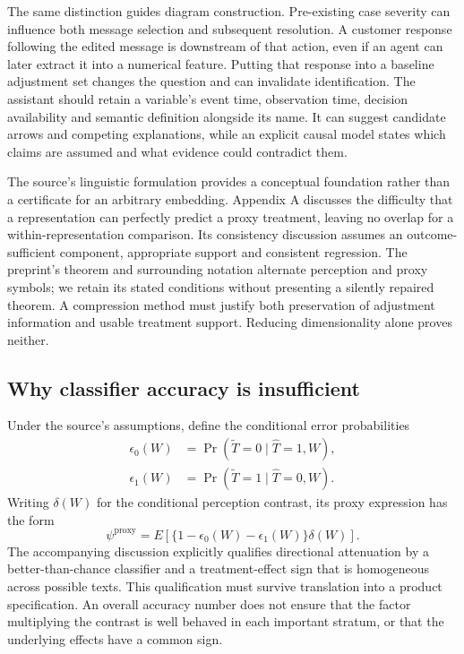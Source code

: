 The same distinction guides diagram construction. Pre-existing case severity can influence both message selection and subsequent resolution. A customer response following the edited message is downstream of that action, even if an agent can later extract it into a numerical feature. Putting that response into a baseline adjustment set changes the question and can invalidate identification. The assistant should retain a variable's event time, observation time, decision availability and semantic definition alongside its name. It can suggest candidate arrows and competing explanations, while an explicit causal model states which claims are assumed and what evidence could contradict them.

The source's linguistic formulation provides a conceptual foundation rather than a certificate for an arbitrary embedding. Appendix A discusses the difficulty that a representation can perfectly predict a proxy treatment, leaving no overlap for a within-representation comparison. Its consistency discussion assumes an outcome-sufficient component, appropriate support and consistent regression. The preprint's theorem and surrounding notation alternate perception and proxy symbols; we retain its stated conditions without presenting a silently repaired theorem. A compression method must justify both preservation of adjustment information and usable treatment support. Reducing dimensionality alone proves neither.~\citep{exec28_lm_pryzant}

\subsection{Why classifier accuracy is insufficient}

Under the source's assumptions, define the conditional error probabilities
\begin{align}
 \epsilon_0(W)&=\Pr(\widetilde T=0\mid\widehat T=1,W),\\
 \epsilon_1(W)&=\Pr(\widetilde T=1\mid\widehat T=0,W).
\end{align}
Writing $\delta(W)$ for the conditional perception contrast, its proxy expression has the form
\begin{equation}
 \psi^{\mathrm{proxy}}=E\!\left[\{1-\epsilon_0(W)-\epsilon_1(W)\}\delta(W)\right].
 \label{eq:exec28-lm-proxy}
\end{equation}
The accompanying discussion explicitly qualifies directional attenuation by a better-than-chance classifier and a treatment-effect sign that is homogeneous across possible texts. This qualification must survive translation into a product specification. An overall accuracy number does not ensure that the factor multiplying the contrast is well behaved in each important stratum, or that the underlying effects have a common sign.~\citep{exec28_lm_pryzant}

